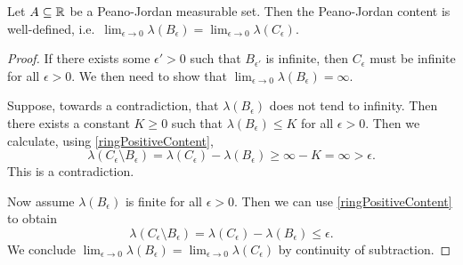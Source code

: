 \begin{lemma}
Let $A\subseteq \mathbb{R}$ be a Peano-Jordan measurable set. Then the Peano-Jordan content is well-defined, i.e.\ $\lim_{\epsilon\to 0}\lambda(B_\epsilon) = \lim_{\epsilon\to 0}\lambda(C_\epsilon)$.
\end{lemma}
\begin{proof}
If there exists some $\epsilon' >0$ such that $B_{\epsilon'}$ is infinite, then $C_\epsilon$ must be infinite for all $\epsilon >0$. We then need to show that $\lim_{\epsilon\to 0}\lambda(B_\epsilon) = \infty$.

Suppose, towards a contradiction, that $\lambda(B_\epsilon)$ does not tend to infinity. Then there exists a constant $K\geq 0$ such that $\lambda(B_\epsilon) \leq K$ for all $\epsilon >0$. Then we calculate, using \ref{ringPositiveContent},
\[ \lambda(C_\epsilon \setminus B_\epsilon) = \lambda(C_\epsilon) - \lambda(B_\epsilon) \geq \infty - K = \infty > \epsilon. \]
This is a contradiction.

Now assume $\lambda(B_\epsilon)$ is finite for all $\epsilon >0$. Then we can use \ref{ringPositiveContent} to obtain
\[ \lambda(C_\epsilon \setminus B_\epsilon) = \lambda(C_\epsilon) - \lambda(B_\epsilon) \leq \epsilon. \]
We conclude $\lim_{\epsilon\to 0}\lambda(B_\epsilon) = \lim_{\epsilon\to 0}\lambda(C_\epsilon)$ by continuity of subtraction.
\end{proof}

